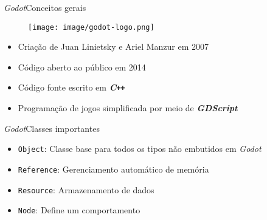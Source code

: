 \begin{frame}{\textit{Godot}}{Conceitos gerais}

\begin{figure}
\texttt{[image: image/godot-logo.png]}
\begin{center}
\color{blue}\tiny\cite{godot}
\end{center}
\end{figure}

\begin{itemize}
\item Criação de Juan Linietsky e Ariel Manzur em 2007

\item Código aberto ao público em 2014

\item<2-> Código fonte escrito em \textbf{\textit{C\texttt{++}}}

\item<3-> Programação de jogos simplificada por meio de \textbf{\textit{GDScript}}
\end{itemize}
\end{frame}


\begin{frame}{\textit{Godot}}{Classes importantes}

\begin{itemize}
\item \texttt{Object}: Classe base para todos os tipos não embutidos em \textit{Godot}

\item<2-> \texttt{Reference}: Gerenciamento automático de memória

\item<3-> \texttt{Resource}: Armazenamento de dados

\item<4-> \texttt{Node}: Define um comportamento
\end{itemize}

\end{frame}
